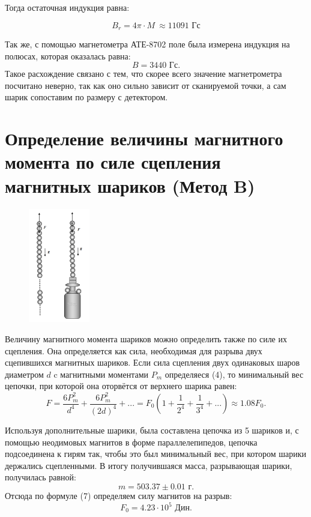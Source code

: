 Тогда остаточная индукция равна:

\[B_r = 4\pi\cdot M\ \approx 11091 \text{  Гс} \]

Так же, с помощью магнетометра АТЕ-8702 поле была измерена индукция на полюсах, которая оказалась равна: 
\[B = 3440 \text{ Гс}.\]
Такое расхождение связано с тем, что скорее всего значение магнетрометра посчитано неверно, так как оно сильно зависит от сканируемой точки, а сам шарик сопоставим по размеру с детектором.

\section{Определение величины магнитного момента по силе
сцепления магнитных шариков (Метод B)}

\begin{figure}
\begin{center}
\includegraphics[height=5cm]{pics/teor.png}
\end{center}
\end{figure}

Величину магнитного момента шариков можно
определить также по силе их сцепления. Она определяется как
сила, необходимая для разрыва двух сцепившихся магнитных
шариков. Если сила сцепления двух одинаковых шаров диаметром $d$ c магнитными моментами $P_m$ определяеся (4), то минимальный вес цепочки, при которой она оторвётся от верхнего шарика равен:
\begin{equation}
F = \frac{6P_m^2}{d^4} + \frac{6P_m^2}{(2d)^4} + ... = F_0\left(1+ \frac{1}{2^4}+\frac{1}{3^4}+...\right) \approx 1.08F_0.
\end{equation}

Используя дополнительные шарики, была составлена цепочка из 5 шариков и, с помощью
неодимовых магнитов в форме параллелепипедов, цепочка подсоединена к гирям так, чтобы это был минимальный вес, при котором шарики держались сцепленными. В итогу получившаяся масса, разрывающая шарики, получилась равной:
\[m = 503.37 \pm 0.01 \text{ г}.\]
Отсюда по формуле (7) определяем силу магнитов на разрыв:
\[F_0 = 4.23\cdot 10^5 \text{ Дин}. \]

